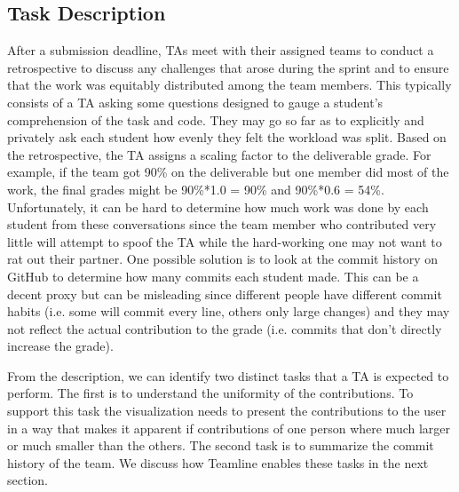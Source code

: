 \documentclass[../manifest.tex]{subfiles}
\begin{document}
\subsection{Task Description}
After a submission deadline, TAs meet with their assigned
teams to conduct a retrospective to discuss any challenges that arose
during the sprint and to ensure that the work was equitably distributed among the
team members. This typically consists of a TA asking some questions designed to
gauge a student's comprehension of the task and code. They may go so far as to
explicitly and privately ask each student how evenly they felt the workload was
split. Based on the retrospective, the TA assigns a scaling factor to the deliverable grade. For example, if
the team got 90\% on the deliverable but one member did most of the work, the final
grades might be 90\%*1.0 = 90\% and 90\%*0.6 = 54\%. Unfortunately, it can be hard
to determine how much work was done by each student from these conversations since
the team member who contributed very little will attempt to spoof the TA while the
hard-working one may not want to rat out their partner. One possible solution is
to look at the commit history on GitHub to determine how many commits each student
made. This can be a decent proxy but can be misleading since different people have
different commit habits (i.e. some will commit every line, others only large changes)
and they may not reflect the actual contribution to the grade (i.e. commits that
don't directly increase the grade).

From the description, we can identify two distinct tasks that a TA is expected to perform. The first is to understand the uniformity of the contributions. To support this task the visualization needs to present the contributions to the user in a way that makes it apparent if contributions of one person where much larger or much smaller than the others. The second task is to summarize the commit history of the team. We discuss how Teamline enables these tasks in the next section.
\end{document}
